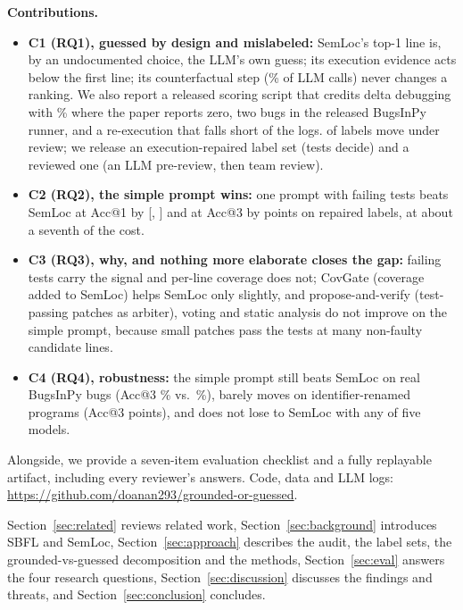 \noindent\textbf{Contributions.}
\begin{itemize}
\item \textbf{C1 (RQ1), guessed by design and mislabeled:} SemLoc's top-1 line is, by an undocumented choice, the LLM's own
guess; its execution evidence acts below the first line; its counterfactual step (\CostCfSharePct\% of LLM calls) never
changes a ranking. We also report a released scoring script that credits delta debugging with \RqOneDdAuthorAllAccOne\%
where the paper reports zero, two bugs in the released BugsInPy runner, and a re-execution that falls short of the logs.
\LabaudAllMoved{} of \LabaudAllN{} labels move under review; we release an execution-repaired label set (tests decide) and
a reviewed one (an LLM pre-review, then team review).
\item \textbf{C2 (RQ2), the simple prompt wins:} one prompt with failing tests beats SemLoc at Acc@1 by
\RqTwoRepairedAllLlmTestsDAccOne{} [\RqTwoRepairedAllLlmTestsDAccOneLo, \RqTwoRepairedAllLlmTestsDAccOneHi] and at Acc@3
by \RqTwoRepairedAllLlmTestsDAccThree{} points on repaired labels, at about a seventh of the cost.
\item \textbf{C3 (RQ3), why, and nothing more elaborate closes the gap:} failing tests carry the signal and per-line
coverage does not; CovGate (coverage added to SemLoc) helps SemLoc only slightly, and propose-and-verify (test-passing
patches as arbiter), voting and static analysis do not improve on the simple prompt, because small patches pass the
tests at many non-faulty candidate lines.
\item \textbf{C4 (RQ4), robustness:} the simple prompt still beats SemLoc on real BugsInPy bugs (Acc@3
\BipAllLlmTestsAccThreeMean\% vs.\ \BipAllSemlocPriorAccThreeMean\%), barely moves on identifier-renamed programs (Acc@3
\RenRepairedLlmTestsDAccThree{} points), and does not lose to SemLoc with any of five models.
\end{itemize}
Alongside, we provide a seven-item evaluation checklist and a fully replayable artifact, including every reviewer's
answers. Code, data and LLM logs: \url{https://github.com/doanan293/grounded-or-guessed}.

Section~\ref{sec:related} reviews related work, Section~\ref{sec:background} introduces SBFL and SemLoc,
Section~\ref{sec:approach} describes the audit, the label sets, the grounded-vs-guessed decomposition and the methods, Section~\ref{sec:eval} answers the four
research questions, Section~\ref{sec:discussion} discusses the findings and threats, and Section~\ref{sec:conclusion} concludes.
